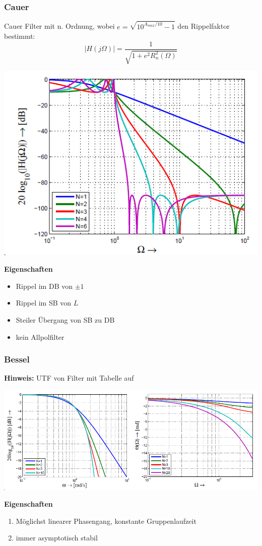 \subsubsection{Cauer}
Cauer Filter mit n. Ordnung, wobei $e=\sqrt{10^{A_{max}/10}-1}$ den Rippelfaktor bestimmt:
\[
\left|H(j\Omega)\right| = \frac{1}{\sqrt{1+ e^2R_n^2(\Omega)}}
\]
\begin{center}
	\includegraphics[width=0.6\columnwidth]{Images/cauer}
\end{center}
\noindent\textbf{Eigenschaften}
\begin{itemize}[nosep]
	\item Rippel im DB von $\pm1$
	\item Rippel im SB von $L$
	\item Steiler Übergang von SB zu DB
	\item kein Allpolfilter
\end{itemize}

\subsubsection{Bessel}

\textbf{Hinweis:} UTF von Filter mit Tabelle auf ~\\
\begin{center}
	\includegraphics[width=0.8\columnwidth]{Images/bessel}
\end{center}
\noindent\textbf{Eigenschaften}
\begin{enumerate}[nosep]
	\item Möglichst linearer Phasengang, konstante Gruppenlaufzeit
	\item immer asymptotisch stabil
\end{enumerate}

